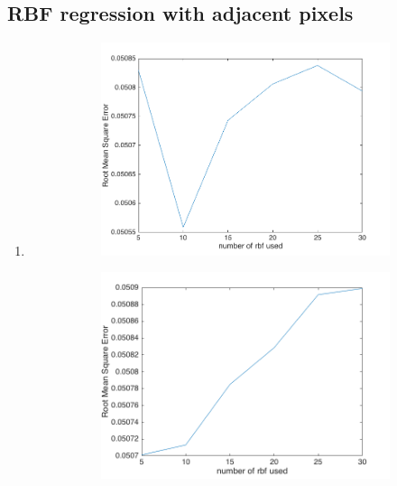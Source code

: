 \documentclass{article}
\begin{document}
		\subsection{RBF regression with adjacent pixels}
			\begin{enumerate}[label=(\alph*)]
				\item
				 	\begin{figure}[t]
				 		\caption{Root Mean Square Error against number of radial basis functions used}
				 		\begin{subfigure}{0.5\textwidth}
				 			\includegraphics[width=\linewidth]{images/p1-3-a_5_30.png}
				 			\caption{}
				 			\label{fig:p-1-3-a_a}
			 			\end{subfigure}
				 		\begin{subfigure}{0.5\textwidth}
				 			\includegraphics[width=\linewidth]{images/p1-3-a_5_30_another.png}

\end{subfigure}
\end{figure}
\end{enumerate}
\end{document}
